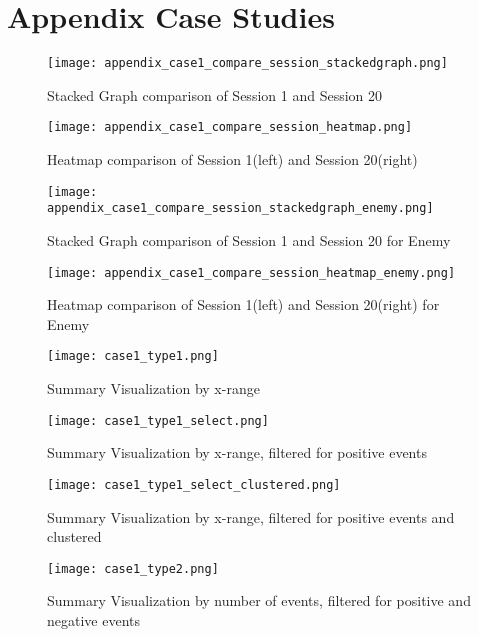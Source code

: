 \chapter{Appendix Case Studies}
\label{chap:appendix1}


\begin{figure}
\centering
\texttt{[image: appendix\_case1\_compare\_session\_stackedgraph.png]}
\caption{Stacked Graph comparison of Session 1 and Session 20}
\label{fig:app1_stacked}
\end{figure}

\begin{figure}
\centering
\texttt{[image: appendix\_case1\_compare\_session\_heatmap.png]}
\caption{Heatmap comparison of Session 1(left) and Session 20(right)}
\label{fig:app1_heatmap}
\end{figure}

\begin{figure}
\centering
\texttt{[image: appendix\_case1\_compare\_session\_stackedgraph\_enemy.png]}
\caption{Stacked Graph comparison of Session 1 and Session 20 for Enemy}
\label{fig:app1_stacked_enemy}
\end{figure}

\begin{figure}
\centering
\texttt{[image: appendix\_case1\_compare\_session\_heatmap\_enemy.png]}
\caption{Heatmap comparison of Session 1(left) and Session 20(right) for Enemy}
\label{fig:app1_heatmap_enemy}
\end{figure}

\begin{figure}
\centering
\texttt{[image: case1\_type1.png]}
\caption{Summary Visualization by x-range}
\label{fig:case1_type1}
\end{figure}

\begin{figure}
\centering
\texttt{[image: case1\_type1\_select.png]}
\caption{Summary Visualization by x-range, filtered for positive events}
\label{fig:case1_type1_select}
\end{figure}

\begin{figure}
\centering
\texttt{[image: case1\_type1\_select\_clustered.png]}
\caption{Summary Visualization by x-range, filtered for positive events and clustered}
\label{fig:case1_type1_select_c}
\end{figure}

\begin{figure}
\centering
\texttt{[image: case1\_type2.png]}
\caption{Summary Visualization by number of events, filtered for positive and negative events}
\label{fig:case1_type2}
\end{figure}


